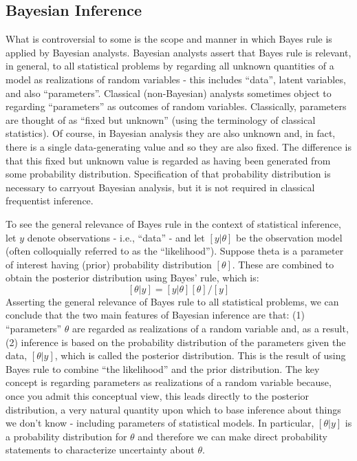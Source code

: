 \subsection{Bayesian Inference}


What is controversial to some is the scope and manner in which Bayes
rule is applied by Bayesian analysts. Bayesian analysts assert that
Bayes rule is relevant, in general, to all statistical problems by
regarding all unknown quantities of a model as realizations of random
variables - this includes ``data'', latent variables, and also
``parameters''. Classical (non-Bayesian) analysts sometimes object to
regarding ``parameters'' as outcomes of random variables. Classically,
parameters are thought of as ``fixed but unknown'' (using the
terminology of classical statistics). Of course, in Bayesian analysis
they are also unknown and, in fact, there is a single data-generating
value and so they are also fixed. The difference is that this fixed
but unknown value is regarded as having been generated from some
probability distribution. Specification of that probability
distribution is necessary to carryout Bayesian analysis, but it is not
required in classical frequentist inference.


To see the general relevance of Bayes rule in the context of
statistical inference, let $y$ denote observations - i.e., ``data'' -
and let $[y|\theta]$ be the observation model (often colloquially
referred to as the ``likelihood'').  Suppose theta is a parameter of
interest having (prior) probability distribution $[\theta]$. These are
combined to obtain the posterior distribution using Bayes' rule, which
is:
\[
 [\theta|y]= [y|\theta][\theta]/[y]
\]
Asserting the general relevance of Bayes rule to all statistical
problems, we can conclude that the two main features of Bayesian
inference are that: (1) ``parameters'' $\theta$ are regarded as realizations of
a random variable and, as a result, (2) inference is based on the
probability distribution of the parameters given the data,
$[\theta|y]$,
which is
called the posterior distribution. This is the result of using Bayes
rule to combine ``the likelihood'' and the prior distribution.  The
key concept is regarding parameters as realizations of a random
variable because, once you admit this conceptual view, this leads
directly to the posterior distribution, a very natural quantity upon
which to base inference about things we don't know -  including
parameters of statistical models.  In particular, $[\theta|y]$ is a
probability distribution for $\theta$ and therefore we can make direct
probability statements to characterize uncertainty about
$\theta$.

